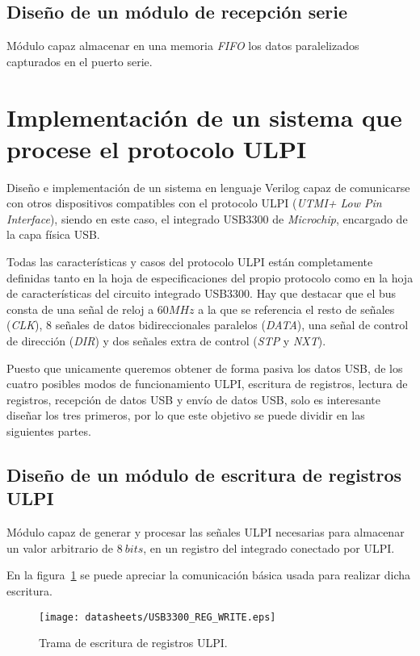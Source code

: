 \subsection{Diseño de un módulo de recepción serie}
Módulo capaz almacenar en una memoria \emph{FIFO} los datos paralelizados capturados en el puerto serie.



\section{Implementación de un sistema que procese el protocolo ULPI}
Diseño e implementación de un sistema en lenguaje Verilog capaz de comunicarse con otros dispositivos compatibles con el protocolo ULPI (\emph{UTMI+ Low Pin Interface}), siendo en este caso, el integrado USB3300 de \emph{Microchip}, encargado de la capa física USB.

Todas las características y casos del protocolo ULPI están completamente definidas tanto en la hoja de especificaciones del propio protocolo\cite{ulpi-specs} como en la hoja de características del circuito integrado USB3300\cite{microchip:usb3300}. Hay que destacar que el bus consta de una señal de reloj a $60MHz$ a la que se referencia el resto de señales (\emph{CLK}), 8 señales de datos bidireccionales paralelos (\emph{DATA}), una señal de control de dirección (\emph{DIR}) y dos señales extra de control (\emph{STP} y \emph{NXT}).

Puesto que unicamente queremos obtener de forma pasiva los datos USB, de los cuatro posibles modos de funcionamiento ULPI, escritura de registros, lectura de registros, recepción de datos USB y envío de datos USB, solo es interesante diseñar los tres primeros, por lo que este objetivo se puede dividir en las siguientes partes.

\subsection{Diseño de un módulo de escritura de registros ULPI}
Módulo capaz de generar y procesar las señales ULPI necesarias para almacenar un valor arbitrario de $8~bits$, en un registro del integrado conectado por ULPI.

En la figura~\ref{fig:ULPI_REG_WRITE} se puede apreciar la comunicación básica usada para realizar dicha escritura.
\begin{figure}[hbt]
    \centering
    \texttt{[image: datasheets/USB3300\_REG\_WRITE.eps]}
    \caption{Trama de escritura de registros ULPI.}
    \label{fig:ULPI_REG_WRITE}
\end{figure}

